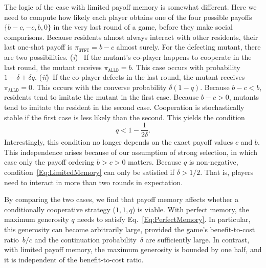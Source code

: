 \documentclass[11pt]{article}
\def\alld{\texttt{ALLD}}
\def\gtft{\texttt{GTFT}}
\theoremstyle{plainCl1}
\theoremstyle{plainCl2}
\begin{document}
The logic of the case with limited payoff memory is somewhat different. 
Here we need to compute how likely each player obtains one of the four possible payoffs $\{b\!-\!c, -c, b, 0\}$ in the very last round of a game, before they make social comparisons.
Because residents almost always interact with other residents, their last one-shot payoff is $\pi_\gtft = b\!-\!c$ almost surely. 
For the defecting mutant, there are two possibilities. 
({\it i})~ If the mutant's co-player happens to cooperate in the last round, the mutant receives $\pi_\alld\!=\!b$.
This case occurs with probability $1\!-\!\delta\!+\!\delta q$. 
({\it ii})~If the co-player defects in the last round, the mutant receives $\pi_\alld=\!0$. 
This occurs with the converse probability $\delta(1\!-\!q)$.
Because $b\!-\!c\!<\!b$, residents tend to imitate the mutant in the first case. 
Because $b\!-\!c\!>\!0$, mutants tend to imitate the resident in the second case. 
Cooperation is stochastically stable if the first case is less likely than the second. 
This yields the condition
\begin{equation} \label{Eq:LimitedMemory}
q < 1\!-\!\frac{1}{2 \delta}.
\end{equation}
Interestingly, this condition no longer depends on the exact payoff values $c$ and $b$. 
This independence arises because of our assumption of strong selection, in which case only the payoff ordering $b\!>\!c\!>\!0$ matters. Because $q$ is non-negative, condition~\eqref{Eq:LimitedMemory} can only be satisfied if $\delta\!>\!1/2$. That is, players need to interact in more than two rounds in expectation. 


By comparing the two cases, we find that payoff memory affects whether a conditionally cooperative strategy ($1,1,q$) is viable. 
With perfect memory, the maximum generosity $q$ needs to satisfy Eq.~\eqref{Eq:PerfectMemory}.
In particular, this generosity can become arbitrarily large, provided the game's benefit-to-cost ratio~$b/c$ and the continuation probability~$\delta$ are sufficiently large. 
In contrast, with limited payoff memory, the maximum generosity is bounded by one half, and it is independent of the benefit-to-cost ratio.\\


\end{document}
